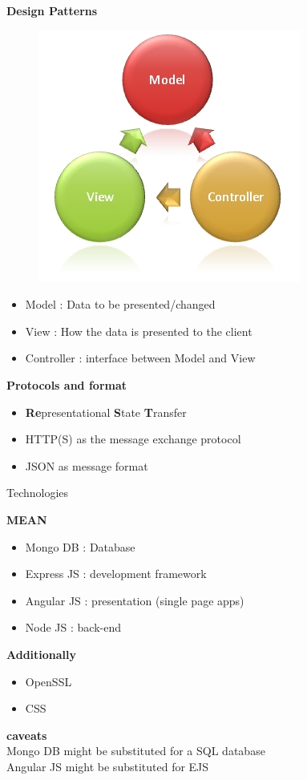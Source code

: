 \documentclass[11pt]{beamer}
\begin{document}
\begin{frame}
\textbf{Design Patterns}
\pause
\begin{figure}
		\includegraphics[scale=0.4]{27.jpg} 
		\end{figure}
	\begin{itemize}
		\item Model : Data to be presented/changed
		\item View : How the data is presented to the client
		\item Controller : interface between Model and View 
	\end{itemize}
	\textbf{Protocols and format}
	\begin{itemize}
		\pause
		\item \textbf{Re}presentational \textbf{S}tate \textbf{T}ransfer%
		\item HTTP(S) as the message exchange protocol  
		\item JSON as message format%
	\end{itemize}
\end{frame}
\begin{frame}{Technologies}
	\begin{flushleft}
	\textbf{MEAN}
	\begin{itemize}
		\pause
		\item Mongo DB 	: Database 
		\pause
		\item Express JS : development framework
		\pause
		\item Angular JS : presentation (single page apps)
		\pause
		\item Node JS  : back-end 
	\end{itemize}
	\pause
	\textbf{Additionally}
		\begin{itemize}
		\item OpenSSL%
		\item CSS%
		\end{itemize}
	\textbf{caveats}\\
	\pause
	Mongo DB might be substituted for a SQL database \\
	Angular JS might be substituted for EJS
	\end{flushleft}
\end{frame}
\end{document}
